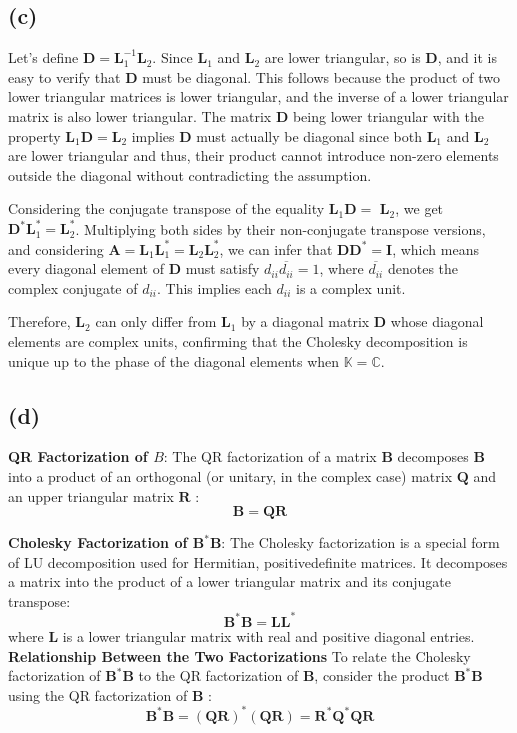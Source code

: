 \documentclass{article}
\begin{document}
\subsection{(c)}
Let's define $\boldsymbol{D}=\boldsymbol{L}_1^{-1} \boldsymbol{L}_2$. Since $\boldsymbol{L}_1$ and $\boldsymbol{L}_2$ are lower triangular, so is $\boldsymbol{D}$, and it is easy to verify that $\boldsymbol{D}$ must be diagonal. This follows because the product of two lower triangular matrices is lower triangular, and the inverse of a lower triangular matrix is also lower triangular. The matrix $\boldsymbol{D}$ being lower triangular with the property $\boldsymbol{L}_1 \boldsymbol{D}=\boldsymbol{L}_2$ implies $\boldsymbol{D}$ must actually be diagonal since both $\boldsymbol{L}_1$ and $\boldsymbol{L}_2$ are lower triangular and thus, their product cannot introduce non-zero elements outside the diagonal without contradicting the assumption.\par
Considering the conjugate transpose of the equality $\boldsymbol{L}_1 \boldsymbol{D}=$ $\boldsymbol{L}_2$, we get $\boldsymbol{D}^* \boldsymbol{L}_1^*=\boldsymbol{L}_2^*$. Multiplying both sides by their non-conjugate transpose versions, and considering $\boldsymbol{A}=\boldsymbol{L}_1 \boldsymbol{L}_1^*=\boldsymbol{L}_2 \boldsymbol{L}_2^*$, we can infer that $\boldsymbol{D} \boldsymbol{D}^*=\boldsymbol{I}$, which means every diagonal element of $\boldsymbol{D}$ must satisfy $d_{i i} \overline{d_{i i}}=1$, where $\overline{d_{i i}}$ denotes the complex conjugate of $d_{i i}$. This implies each $d_{i i}$ is a complex unit.\par
Therefore, $\boldsymbol{L}_2$ can only differ from $\boldsymbol{L}_1$ by a diagonal matrix $\boldsymbol{D}$ whose diagonal elements are complex units, confirming that the Cholesky decomposition is unique up to the phase of the diagonal elements when $\mathbb{K}=\mathbb{C}$.
\subsection{(d)}
\textbf{QR Factorization of $B$}:
The QR factorization of a matrix $\boldsymbol{B}$ decomposes $\boldsymbol{B}$ into a product of an orthogonal (or unitary, in the complex case) matrix $\boldsymbol{Q}$ and an upper triangular matrix $\boldsymbol{R}$ :
$$
\boldsymbol{B}=\boldsymbol{Q R}
$$

\textbf{Cholesky Factorization of $\boldsymbol{B}^* \boldsymbol{B}$}:
The Cholesky factorization is a special form of LU decomposition used for Hermitian, positivedefinite matrices. It decomposes a matrix into the product of a lower triangular matrix and its conjugate transpose:
$$
\boldsymbol{B}^* \boldsymbol{B}=\boldsymbol{L} \boldsymbol{L}^*
$$
where $\boldsymbol{L}$ is a lower triangular matrix with real and positive diagonal entries.
\textbf{Relationship Between the Two Factorizations}
To relate the Cholesky factorization of $\boldsymbol{B}^* \boldsymbol{B}$ to the QR factorization of $\boldsymbol{B}$, consider the product $\boldsymbol{B}^* \boldsymbol{B}$ using the QR factorization of $\boldsymbol{B}$ :
$$
\boldsymbol{B}^* \boldsymbol{B}=(\boldsymbol{Q R})^*(\boldsymbol{Q R})=\boldsymbol{R}^* \boldsymbol{Q}^* \boldsymbol{Q} \boldsymbol{R}
$$
\end{document}
